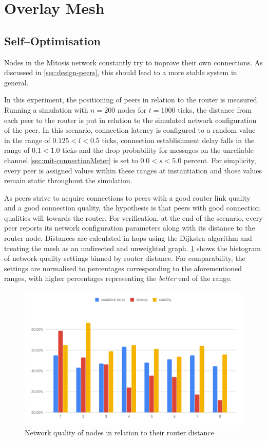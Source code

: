 \section{Overlay Mesh}

\subsection{Self–Optimisation}
Nodes in the Mitosis network constantly try to improve their own connections. As discussed in \vref{sec:design-peers}, this should lead to a more stable system in general.

In this experiment, the positioning of peers in relation to the router is measured. Running a simulation with $n=200$ nodes for $t=1000$ ticks, the distance from each peer to the router is put in relation to the simulated network configuration of the peer. In this scenario, connection latency is configured to a random value in the range of $0.125<l<0.5$ ticks, connection establishment delay falls in the range of $0.1<1.0$ ticks and the drop probability for messages on the unreliable channel \cref{sec:mit-connectionMeter} is set to $0.0<s<5.0$ percent. For simplicity, every peer is assigned values within these ranges at instantiation and those values remain static throughout the simulation.

As peers strive to acquire connections to peers with a good router link quality and a good connection quality, the hypothesis is that peers with good connection qualities will  towards the router. For verification, at the end of the scenario, every peer reports its network configuration parameters along with its distance to the router node. Distances are calculated in hops using the Dijkstra algorithm and treating the mesh as an undirected and unweighted graph.
\cref{fig:connection-quality-per-distance} shows the histogram of network quality settings binned by router distance. For comparability, the settings are normalised to percentages corresponding to the aforementioned ranges, with higher percentages representing the \textit{better} end of the range.

\begin{figure}[htb!]
\centering
\includegraphics[width=1.0\textwidth]{graphics/analysis/connection-quality-per-distance.pdf}
\caption{Network quality of nodes in relation to their router distance}
\label{fig:connection-quality-per-distance}
\end{figure}


